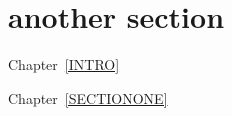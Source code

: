 \documentclass[class=../../utsthesis, crop=false]{standalone}
\begin{document}
\textpages

\chapter{another section}

Chapter~\ref{INTRO}

Chapter~\ref{SECTIONONE}

\blindtext~\cite{Qb1}
\end{document}
